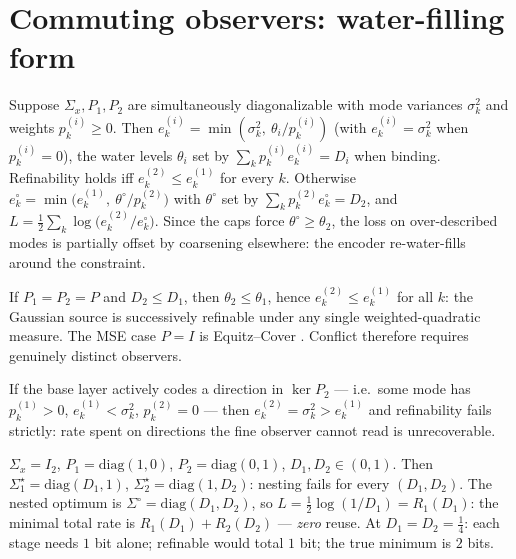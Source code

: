 \documentclass[11pt]{article}
\begin{document}
\section{Commuting observers: water-filling form}
\begin{corollary}\label{cor:commute}
Suppose $\Sigma_x,P_1,P_2$ are simultaneously diagonalizable with mode
variances $\sigma_k^2$ and weights $p_k^{(i)}\ge0$. Then
$e_k^{(i)}=\min(\sigma_k^2,\ \theta_i/p_k^{(i)})$ (with
$e_k^{(i)}=\sigma_k^2$ when $p_k^{(i)}=0$), the water levels $\theta_i$ set
by $\sum_k p_k^{(i)}e_k^{(i)}=D_i$ when binding. Refinability holds iff
$e_k^{(2)}\le e_k^{(1)}$ for every $k$. Otherwise
$e_k^\circ=\min\bigl(e_k^{(1)},\ \theta^\circ/p_k^{(2)}\bigr)$ with
$\theta^\circ$ set by $\sum_k p_k^{(2)}e_k^\circ=D_2$, and
$L=\tfrac12\sum_k\log\bigl(e_k^{(2)}/e_k^\circ\bigr)$. Since the caps force
$\theta^\circ\ge\theta_2$, the loss on over-described modes is partially
offset by coarsening elsewhere: the encoder re-water-fills around the
constraint.
\end{corollary}

\begin{corollary}\label{cor:ec}
If $P_1=P_2=P$ and $D_2\le D_1$, then $\theta_2\le\theta_1$, hence
$e_k^{(2)}\le e_k^{(1)}$ for all $k$: the Gaussian source is successively
refinable under any single weighted-quadratic measure. The MSE case $P=I$ is
Equitz--Cover \cite{equitzcover}. Conflict therefore requires genuinely
distinct observers.
\end{corollary}

\begin{corollary}\label{cor:kernel}
If the base layer actively codes a direction in $\ker P_2$ --- i.e.\ some
mode has $p_k^{(1)}>0$, $e_k^{(1)}<\sigma_k^2$, $p_k^{(2)}=0$ --- then
$e_k^{(2)}=\sigma_k^2>e_k^{(1)}$ and refinability fails strictly: rate spent
on directions the fine observer cannot read is unrecoverable.
\end{corollary}

\begin{example}\label{ex:orth}
$\Sigma_x=I_2$, $P_1=\mathrm{diag}(1,0)$, $P_2=\mathrm{diag}(0,1)$,
$D_1,D_2\in(0,1)$. Then $\Sigma_1^\star=\mathrm{diag}(D_1,1)$,
$\Sigma_2^\star=\mathrm{diag}(1,D_2)$: nesting fails for every
$(D_1,D_2)$. The nested optimum is
$\Sigma^\circ=\mathrm{diag}(D_1,D_2)$, so
$L=\tfrac12\log(1/D_1)=R_1(D_1)$: the minimal total rate is
$R_1(D_1)+R_2(D_2)$ --- \emph{zero} reuse. At $D_1=D_2=\tfrac14$: each
stage needs $1$ bit alone; refinable would total $1$ bit; the true minimum is
$2$ bits.
\end{example}
\end{document}
